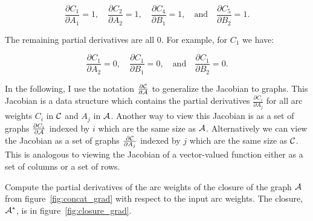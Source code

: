 $$
\frac{\partial C_1}{\partial A_1} = 1,
    \quad \frac{\partial C_2}{\partial A_2} = 1,
    \quad \frac{\partial C_4}{\partial B_1} = 1,
    \quad\textrm{and}\quad \frac{\partial C_5}{\partial B_2} = 1.
$$

The remaining partial derivatives are all $0$. For example, for $C_1$ we have:

$$
\frac{\partial C_1}{\partial A_2} = 0,
    \quad \frac{\partial C_1}{\partial B_1} = 0,
    \quad \textrm{and} \quad \frac{\partial C_1}{\partial B_2} = 0.
$$

In the following, I use the notation $\frac{\partial \mathcal{C}}{\partial \mathcal{A}}$ to
generalize the Jacobian to graphs. This Jacobian is a data structure which
contains the partial derivatives $\frac{\partial C_i}{\partial A_j}$ for all
arc weights $C_i$ in $\mathcal{C}$ and $A_j$ in $\mathcal{A}$. Another way to view this
Jacobian is as a set of graphs $\frac{\partial C_i}{\partial \mathcal{A}}$ indexed by
$i$ which are the same size as $\mathcal{A}$. Alternatively we can view the Jacobian as
a set of graphs $\frac{\partial \mathcal{C}}{\partial A_j}$ indexed by $j$ which are
the same size as $\mathcal{C}$. This is analogous to viewing the Jacobian of a
vector-valued function either as a set of columns or a set of rows.

\begin{example}
Compute the partial derivatives of the arc weights of the closure of the graph
$\mathcal{A}$ from figure~\ref{fig:concat_grad} with respect to the input arc
weights. The closure, $\mathcal{A}^*$, is in figure~\ref{fig:closure_grad}.
\end{example}


